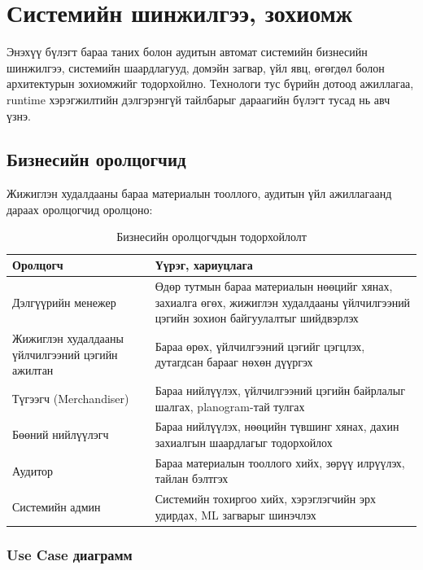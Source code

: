 \chapter{Системийн шинжилгээ, зохиомж}

Энэхүү бүлэгт бараа таних болон аудитын автомат системийн бизнесийн шинжилгээ, системийн шаардлагууд, домэйн загвар, үйл явц, өгөгдөл болон архитектурын зохиомжийг тодорхойлно. Технологи тус бүрийн дотоод ажиллагаа, runtime хэрэгжилтийн дэлгэрэнгүй тайлбарыг дараагийн бүлэгт тусад нь авч үзнэ.

\section{Бизнесийн оролцогчид}

Жижиглэн худалдааны бараа материалын тооллого, аудитын үйл ажиллагаанд дараах оролцогчид оролцоно:

\begin{longtable}{|p{3.5cm}|p{10cm}|}
\caption{Бизнесийн оролцогчдын тодорхойлолт}
\label{tab:stakeholders} \\
\hline
\textbf{Оролцогч} & \textbf{Үүрэг, хариуцлага} \\
\hline
Дэлгүүрийн менежер & Өдөр тутмын бараа материалын нөөцийг хянах, захиалга өгөх, жижиглэн худалдааны үйлчилгээний цэгийн зохион байгуулалтыг шийдвэрлэх \\
\hline
Жижиглэн худалдааны үйлчилгээний цэгийн ажилтан & Бараа өрөх, үйлчилгээний цэгийг цэгцлэх, дутагдсан барааг нөхөн дүүргэх \\
\hline
Түгээгч (Merchandiser) & Бараа нийлүүлэх, үйлчилгээний цэгийн байрлалыг шалгах, planogram-тай тулгах \\
\hline
Бөөний нийлүүлэгч & Бараа нийлүүлэх, нөөцийн түвшинг хянах, дахин захиалгын шаардлагыг тодорхойлох \\
\hline
Аудитор & Бараа материалын тооллого хийх, зөрүү илрүүлэх, тайлан бэлтгэх \\
\hline
Системийн админ & Системийн тохиргоо хийх, хэрэглэгчийн эрх удирдах, ML загварыг шинэчлэх \\
\hline
\end{longtable}

\subsection{Use Case диаграмм}

